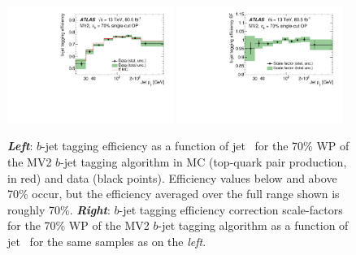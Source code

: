 \begin{figure}[!htb]
    \begin{center}
        \includegraphics[width=0.48\textwidth]{figures/chapter3/ftag/ftag_eff_70_pt}
        \includegraphics[width=0.48\textwidth]{figures/chapter3/ftag/ftag_sf_70_pt}
        \caption{
            \textbf{\textit{Left}}: $b$-jet tagging efficiency as a function of jet \pT~for the 70\% WP of the MV2 $b$-jet
                tagging algorithm in MC (top-quark pair production, in red) and data (black points).
                Efficiency values below and above 70\% occur, but the efficiency averaged over
                the full range shown is roughly 70\%. 
            \textbf{\textit{Right}}: $b$-jet tagging efficiency correction scale-factors for the 70\% WP of the MV2 $b$-jet
                tagging algorithm as a function of jet \pT~for the same
                samples as on the \textit{left}.
        }
        \label{fig:btag_eff_sf}
    \end{center}
\end{figure}



\FloatBarrier

